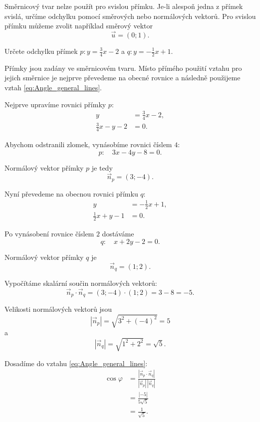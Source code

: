\begin{remark}\label{rem:Vertical_line_angle}
    Směrnicový tvar nelze použít pro svislou přímku. Je-li alespoň
    jedna z přímek svislá, určíme odchylku pomocí směrových nebo
    normálových vektorů. Pro svislou přímku můžeme zvolit například
    směrový vektor
    \[
        \vec{u}=(0;1).
    \]
\end{remark}

\begin{example}\label{exa:Angle_slope_lines_by_conversion}
    Určete odchylku přímek $p: y=\frac{3}{4}x-2$ a $q: y=-\frac{1}{2}x+1$.

    Přímky jsou zadány ve směrnicovém tvaru. Místo přímého použití
    vztahu pro jejich směrnice je nejprve převedeme na obecné rovnice
    a následně použijeme vztah \eqref{eq:Angle_general_lines}.

    Nejprve upravíme rovnici přímky $p$:
    \begin{align*}
        y&=\frac{3}{4}x-2,\\
        \frac{3}{4}x-y-2&=0.
    \end{align*}

    Abychom odstranili zlomek, vynásobíme rovnici číslem $4$:
    \[
        p:\quad 3x-4y-8=0.
    \]

    Normálový vektor přímky $p$ je tedy
    \[
        \vec{n}_p=(3;-4).
    \]

    Nyní převedeme na obecnou rovnici přímku $q$:
    \begin{align*}
        y&=-\frac{1}{2}x+1,\\
        \frac{1}{2}x+y-1&=0.
    \end{align*}

    Po vynásobení rovnice číslem $2$ dostáváme
    \[
        q:\quad x+2y-2=0.
    \]

    Normálový vektor přímky $q$ je
    \[
        \vec{n}_q=(1;2).
    \]

    Vypočítáme skalární součin normálových vektorů:
    \[
        \vec{n}_p\cdot\vec{n}_q
        =
        (3;-4)\cdot(1;2)
        =
        3-8
        =
        -5.
    \]

    Velikosti normálových vektorů jsou
    \[
        |\vec{n}_p|
        =
        \sqrt{3^2+(-4)^2}
        =
        5
    \]
    a
    \[
        |\vec{n}_q|
        =
        \sqrt{1^2+2^2}
        =
        \sqrt5.
    \]

    Dosadíme do vztahu \eqref{eq:Angle_general_lines}:
    \begin{align*}
        \cos\varphi
        &=
        \frac{
            |\vec{n}_p\cdot\vec{n}_q|
        }
        {
            |\vec{n}_p|\,|\vec{n}_q|
        }\\
        &=
        \frac{|-5|}{5\sqrt5}\\
        &=
        \frac{1}{\sqrt5}.
    \end{align*}


\end{example}
